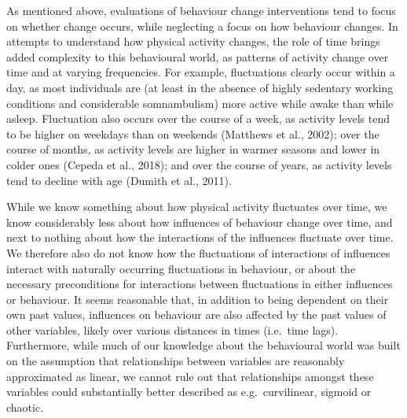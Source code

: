 \documentclass[
  british,
  man,floatsintext]{apa6}
\begin{document}
As mentioned above, evaluations of behaviour change interventions tend to focus on whether change occurs, while neglecting a focus on how behaviour changes. In attempts to understand how physical activity changes, the role of time brings added complexity to this behavioural world, as patterns of activity change over time and at varying frequencies. For example, fluctuations clearly occur within a day, as most individuals are (at least in the absence of highly sedentary working conditions and considerable somnambulism) more active while awake than while asleep. Fluctuation also occurs over the course of a week, as activity levels tend to be higher on weekdays than on weekends (Matthews et al., 2002); over the course of months, as activity levels are higher in warmer seasons and lower in colder ones (Cepeda et al., 2018); and over the course of years, as activity levels tend to decline with age (Dumith et al., 2011).

While we know something about how physical activity fluctuates over time, we know considerably less about how influences of behaviour change over time, and next to nothing about how the interactions of the influences fluctuate over time. We therefore also do not know how the fluctuations of interactions of influences interact with naturally occurring fluctuations in behaviour, or about the necessary preconditions for interactions between fluctuations in either influences or behaviour. It seems reasonable that, in addition to being dependent on their own past values, influences on behaviour are also affected by the past values of other variables, likely over various distances in times (i.e.~time lags). Furthermore, while much of our knowledge about the behavioural world was built on the assumption that relationships between variables are reasonably approximated as linear, we cannot rule out that relationships amongst these variables could substantially better described as e.g.~curvilinear, sigmoid or chaotic.
\end{document}
